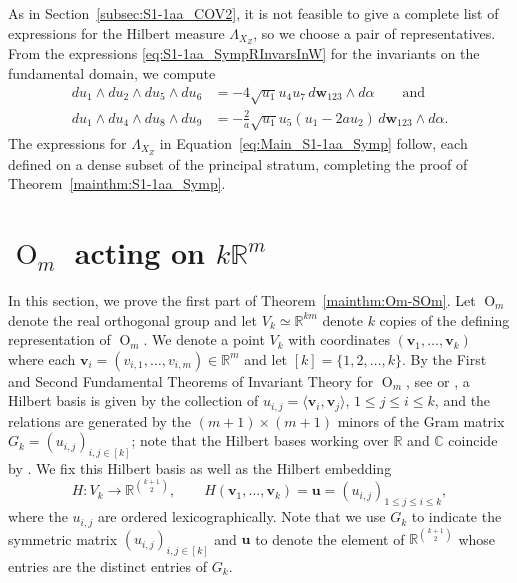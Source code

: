 \documentclass[twoside]{amsart}
\theoremstyle{definition}
\theoremstyle{remark}
\numberwithin{equation}{section}
\newcommand{\C}{\mathbb{C}}
\newcommand{\R}{\mathbb{R}}
\newcommand{\OO}{\operatorname{O}}
\begin{document}
As in Section~\ref{subsec:S1-1aa_COV2}, it is not feasible to give a complete list of expressions for the Hilbert measure $\Lambda_{X_Z}$, so we choose a pair
of representatives. From the expressions \eqref{eq:S1-1aa_SympRInvarsInW} for the invariants on the fundamental domain, we compute
\begin{align*}
    du_1\wedge du_2 \wedge du_5 \wedge du_6
    &=  - 4 \sqrt{u_1} u_4 u_7
            \, d\mathbf{w}_{123}\wedge d\alpha
    \qquad\text{and}
    \\
    du_1\wedge du_4 \wedge du_8 \wedge du_9
    &=  - \frac{2}{a} \sqrt{u_1} u_5 (u_1 - 2a u_2)
            \, d\mathbf{w}_{123}\wedge d\alpha.
\end{align*}
The expressions for $\Lambda_{X_Z}$ in Equation~\eqref{eq:Main_S1-1aa_Symp} follow,
each defined on a dense subset of the principal stratum, completing the proof of Theorem~\ref{mainthm:S1-1aa_Symp}.


\section{$\OO_m$ acting on $k\R^m$}
\label{sec:Om_kRm}

In this section, we prove the first part of Theorem~\ref{mainthm:Om-SOm}.
Let $\OO_m$ denote the real orthogonal group and let $V_k\simeq\R^{km}$ denote $k$ copies of the defining representation of $\OO_m$.
We denote a point $V_k$ with coordinates $(\mathbf{v}_1,\ldots,\mathbf{v}_k)$ where each $\mathbf{v}_i = (v_{i,1},\ldots,v_{i,m})\in\R^m$ and let $[k] = \{1,2,\ldots,k\}$.
By the First and Second Fundamental Theorems of Invariant Theory for $\OO_m$, see \cite[Sec.~9.2 and 9.4]{PopovVinberg} or \cite[Ch.~11, Sec.~2.1 and 5.2]{ProcesiLieGroups},
a Hilbert basis is given by the collection of $u_{i,j} = \langle\mathbf{v}_i,\mathbf{v}_j\rangle$, $1\leq j\leq i\leq k$, and the relations are generated by
the $(m+1)\times(m+1)$ minors of the Gram matrix $G_k = (u_{i,j})_{i,j\in[k]}$; note that the Hilbert bases working over $\R$ and $\C$ coincide by
\cite[Thrm.~5.8(1)]{GWSliftingHomotopies}. We fix this Hilbert basis as well as the Hilbert embedding
\begin{equation}
\label{eq:Om-HilbertEmbed}
    H\colon V_k\to\R^{{k+1\choose 2}},
    \qquad
    H(\mathbf{v}_1,\ldots,\mathbf{v}_k) = \mathbf{u} = (u_{i,j})_{1\leq j\leq i\leq k},
\end{equation}
where the $u_{i,j}$ are ordered lexicographically. Note that we use $G_k$ to indicate the symmetric matrix $(u_{i,j})_{i,j\in[k]}$ and $\mathbf{u}$ to denote
the element of $\R^{{k+1\choose 2}}$ whose entries are the distinct entries of $G_k$.
\end{document}

